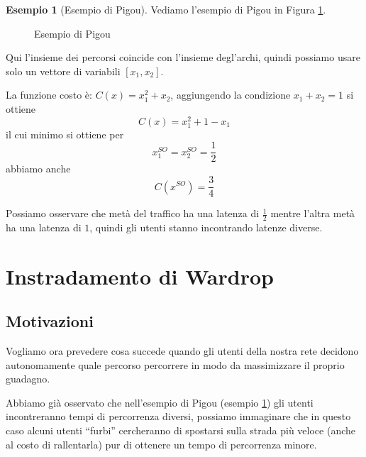 \documentclass[a4paper]{article}
\theoremstyle{plain}
\theoremstyle{definition}
\newtheorem{myes}[myteo]{Esempio}
\theoremstyle{remark}
\newcommand{\pa}[1]{\left(#1\right)}
\newcommand{\bra}[1]{\left[#1\right]}
\begin{document}
\begin{myes}[Esempio di Pigou]
  \label{es:esempio-pigou}
  Vediamo l'esempio di Pigou in Figura \ref{fig:esempio-pigou}.

  \begin{figure}[ht]
    \centering
    \caption{Esempio di Pigou}
    \label{fig:esempio-pigou}
  \end{figure}
  
  Qui l'insieme dei percorsi coincide con l'insieme degl'archi, quindi
  possiamo usare solo un vettore di variabili $\bra{x_1, x_2}$.

  La funzione costo è: $C\pa{x} = x_1^2 + x_2$, aggiungendo la
  condizione $x_1 + x_2 = 1$ si ottiene
  \[ C\pa{x} = x_1 ^2 + 1 - x_1 \]
  il cui minimo si ottiene per
  \[ x^{SO}_1 = x^{SO}_2 = \frac{1}{2} \]
  abbiamo anche
  \[ C\pa{x^{SO}} = \frac{3}{4} \]

  Possiamo osservare che metà del traffico ha una latenza di
  $\frac{1}{2}$ mentre l'altra metà ha una latenza di $1$, quindi gli
  utenti stanno incontrando latenze diverse.
\end{myes}

\section{Instradamento di Wardrop}

\subsection{Motivazioni}
\label{sec:wardrop-motivazioni}

Vogliamo ora prevedere cosa succede quando gli utenti della nostra
rete decidono autonomamente quale percorso percorrere in modo da
massimizzare il proprio guadagno.

Abbiamo già osservato che nell'esempio di Pigou (esempio
\ref{es:esempio-pigou}) gli utenti incontreranno tempi di percorrenza
diversi, possiamo immaginare che in questo caso alcuni utenti
``furbi'' cercheranno di spostarsi sulla strada più veloce (anche al
costo di rallentarla) pur di ottenere un tempo di percorrenza minore.
\end{document}
